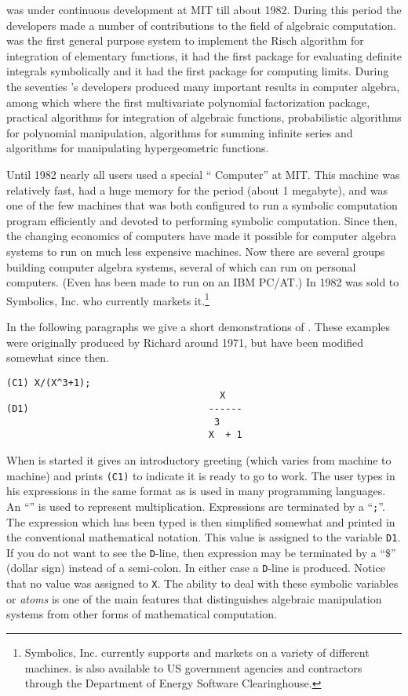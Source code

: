 {\Macsyma} was under continuous development at MIT till about 1982.
During this period the developers made a number of contributions to the
field of algebraic computation.  {\Macsyma} was the first general purpose
system to implement the Risch algorithm for integration of elementary
functions, it had the first package for evaluating definite integrals
symbolically and it had the first package for computing limits.  During
the seventies {\Macsyma}'s developers produced many important results in
computer algebra, among which where the first multivariate polynomial
factorization package, practical algorithms for integration of algebraic
functions, probabilistic algorithms for polynomial manipulation,
algorithms for summing infinite series and algorithms for manipulating
hypergeometric functions.

Until 1982 nearly all {\Macsyma} users used a special ``{\Macsyma} Computer''
at MIT.  This machine was relatively fast, had a huge memory for the period
(about 1 megabyte), and was one of the few machines that was both
configured to run a symbolic computation program efficiently and devoted to
performing symbolic computation.  Since then, the changing economics of
computers have made it possible for computer algebra systems to run on much
less expensive machines.  Now there are several groups building computer
algebra systems, several of which can run on personal computers.  (Even
{\Macsyma} has been made to run on an IBM PC/AT.) In 1982 {\Macsyma} was sold
to Symbolics, Inc.  who currently markets it.\footnote{Symbolics, Inc.
currently supports and markets {\Macsyma} on a variety of different machines.
{\Macsyma} is also available to US government agencies and contractors through
the Department of Energy Software Clearinghouse.}

In the following paragraphs we give a short demonstrations of {\Macsyma}.
These examples were originally produced by Richard {\Fateman} around 1971, but
have been modified somewhat since then.
 
\begin{verbatim}
(C1) X/(X^3+1);
                                      X
(D1)                                ------
                                     3
                                    X  + 1
\end{verbatim}
When {\Macsyma} is started it gives an introductory greeting (which varies
from machine to machine) and prints {\tt (C1)} to indicate
it is ready to go to work.  The user types in his expressions in the
same format as is used in many programming languages.  An ``{\tt *}''
is used to represent multiplication.  Expressions are terminated by
a ``{\tt ;}''.  The expression which has been typed is then
simplified somewhat and printed in the conventional mathematical notation.
This value is assigned to the variable {\tt D1}.  If you do not want to
see the {\tt D}-line, then expression may be terminated by a ``$\$ $'' (dollar
sign) instead of a semi-colon.  In either case a {\tt D}-line is
produced.  Notice that no value was
assigned to {\tt X}.  The ability to deal with these symbolic variables or {\em
atoms} is one of the main features that distinguishes algebraic manipulation
systems from other forms of mathematical computation.

